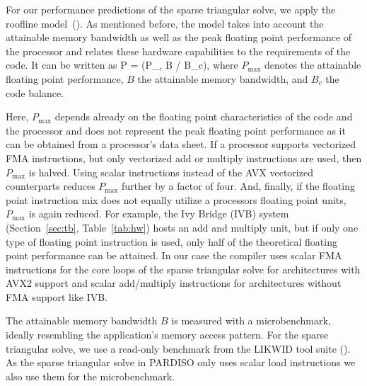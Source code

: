 For our performance predictions of the sparse triangular solve, we apply the roofline model~(\cite{williams-2009}).
As mentioned before, the model takes into account the attainable memory bandwidth as well as
the
peak floating
point performance of the processor and 
relates these hardware capabilities %
to
the requirements of the code.
It can be written as
%
\be
  P = \min(P_, B / B_c),
\ee
where $P_\text{max}$ denotes the attainable floating point performance, $B$ the
attainable memory bandwidth, and $B_c$ the code balance.

Here, $P_\text{max}$
depends already on the floating point characteristics of the code and the
processor and does not represent the peak floating point performance as it can
be obtained from a processor's data sheet. 
If a processor supports vectorized FMA instructions, but
only vectorized add or multiply instructions are used, then $P_\text{max}$ is
halved.
Using scalar instructions instead of the AVX vectorized counterparts reduces
$P_\text{max}$ further by a factor of four.
%
And, finally, if the floating point instruction mix does not equally utilize a
processors floating point units, $P_\text{max}$ is again reduced.
For example, the Ivy Bridge (IVB) system (Section~\ref{sec:tb}, Table~\ref{tab:hw}) hosts an add and
multiply unit, but if only one type of floating point instruction is used, only
half of the theoretical floating
point performance can be attained. 
%
In our case the compiler uses 
scalar FMA instructions
for the core loops of the %
sparse triangular solve
for architectures
with AVX2 support and scalar \linebreak add/multiply instructions for
architectures without FMA support like IVB.

The attainable memory bandwidth $B$ is measured with a microbenchmark,
ideally resembling the application's memory access pattern. 
For the
sparse triangular solve,
we use a read-only benchmark from the LIKWID tool suite (\cite{likwid-2010-arxiv}).
%
As the sparse triangular solve
in PARDISO only uses scalar load instructions we also use them
for the microbenchmark. 

